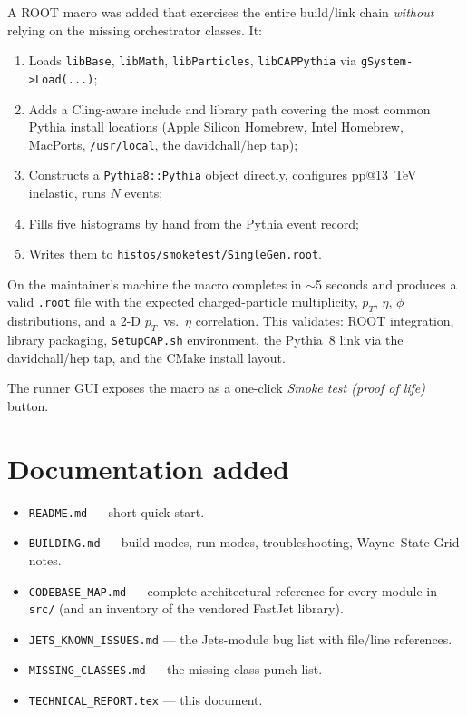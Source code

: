 \documentclass[11pt,a4paper]{article}
\begin{document}
A ROOT macro was added that exercises the entire build/link chain
\emph{without} relying on the missing orchestrator classes. It:

\begin{enumerate}[leftmargin=2em,itemsep=0pt]
  \item Loads \texttt{libBase}, \texttt{libMath}, \texttt{libParticles},
        \texttt{libCAPPythia} via \texttt{gSystem->Load(...)};
  \item Adds a Cling-aware include and library path covering the most
        common Pythia install locations (Apple Silicon Homebrew, Intel
        Homebrew, MacPorts, \texttt{/usr/local}, the davidchall/hep tap);
  \item Constructs a \texttt{Pythia8::Pythia} object directly,
        configures pp@13~TeV inelastic, runs $N$ events;
  \item Fills five histograms by hand from the Pythia event record;
  \item Writes them to \texttt{histos/smoketest/SingleGen.root}.
\end{enumerate}

\noindent
On the maintainer's machine the macro completes in $\sim$5 seconds and
produces a valid \texttt{.root} file with the expected charged-particle
multiplicity, $p_T$, $\eta$, $\phi$ distributions, and a 2-D $p_T$~vs.~$\eta$
correlation. This validates: ROOT integration, library packaging,
\texttt{SetupCAP.sh} environment, the Pythia~8 link via the davidchall/hep
tap, and the CMake install layout.

\noindent
The runner GUI exposes the macro as a one-click \emph{Smoke test (proof of
life)} button.

\section{Documentation added}

\begin{itemize}[leftmargin=2em,itemsep=0pt]
  \item \texttt{README.md} --- short quick-start.
  \item \texttt{BUILDING.md} --- build modes, run modes, troubleshooting,
        Wayne~State Grid notes.
  \item \texttt{CODEBASE\_MAP.md} --- complete architectural reference for
        every module in \texttt{src/} (and an inventory of the vendored
        FastJet library).
  \item \texttt{JETS\_KNOWN\_ISSUES.md} --- the Jets-module bug list with
        file/line references.
  \item \texttt{MISSING\_CLASSES.md} --- the missing-class punch-list.
  \item \texttt{TECHNICAL\_REPORT.tex} --- this document.
\end{itemize}
\end{document}

